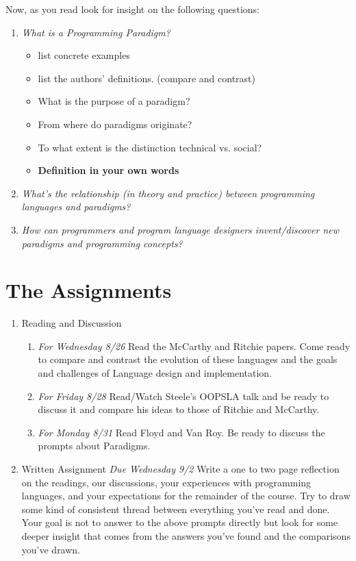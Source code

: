 \documentclass[10pt]{article}
\begin{document}
Now, as you read look for insight on the following questions:
\begin{enumerate}
\item \textit{What is a Programming Paradigm?}
\begin{itemize}
\item list concrete examples
\item list the authors' definitions. (compare and contrast)
\item What is the purpose of a paradigm? 
\item From where do paradigms originate? 
\item To what extent is the distinction technical vs. social?
\item \textbf{Definition in your own words}
\end{itemize}
\item \textit{What's the relationship (in theory and practice) between programming languages and paradigms?}
\item \textit{How can programmers and program language designers invent/discover new paradigms and programming concepts?}
\end{enumerate}


\section{The Assignments}

\begin{center}
\begin{enumerate}
\item Reading and Discussion
\begin{enumerate}
\item \textit{For Wednesday 8/26} Read the McCarthy and Ritchie papers. Come ready to compare and contrast the evolution of these languages and the goals and challenges of Language design and implementation. 
\item \textit{For Friday 8/28} Read/Watch Steele's OOPSLA talk and be ready to discuss it and compare his ideas to those of Ritchie and McCarthy.
\item \textit{For Monday 8/31} Read Floyd and Van Roy. Be ready to discuss the prompts about Paradigms.
\end{enumerate} 
\item Written Assignment \textit{Due Wednesday 9/2}
\newline 
Write a one to two page reflection on the readings, our discussions, your experiences with programming languages, and your expectations for the remainder of the course. Try to draw some kind of consistent thread between everything you've read and done.  Your goal is not to answer to the above prompts directly but look for some deeper insight that comes from the answers you've found and the comparisons you've drawn.
\end{enumerate}
\end{center}




\end{document}
